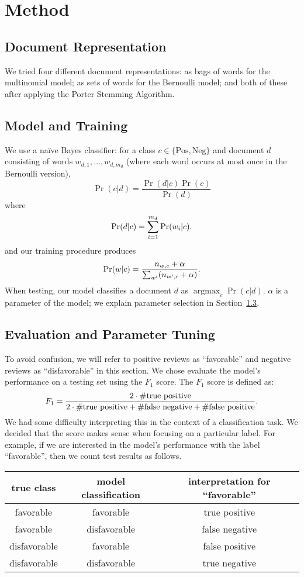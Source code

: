 \documentclass{article}
\DeclareMathOperator{\Argmax}{argmax}
\newcommand{\PosC}{\mathrm{Pos}}
\newcommand{\NegC}{\mathrm{Neg}}
\begin{document}
\section{Method}

\subsection{Document Representation}

We tried four different document representations: as bags of words for the multinomial model; as sets of words for the Bernoulli model; and both of these after applying the Porter Stemming Algorithm.

\subsection{Model and Training}

We use a na\"ive Bayes classifier: for a class \(c \in \{\PosC, \NegC\}\) and document \(d\) consisting of words \(w_{d,1},\dotsc,w_{d,m_d}\) (where each word occurs at most once in the Bernoulli version),
\[\Pr(c|d)=\frac{\Pr(d|c)\Pr(c)}{\Pr(d)}\]
where
\[\Pr(d|c)=\sum_{i=1}^{m_d}\Pr(w_i|c)\ldotp\]
and our training procedure produces
\[\Pr(w|c)=\frac{n_{w,c}+\alpha}{\sum_{w'}(n_{w',c}+\alpha)}\ldotp\]
When testing, our model classifies a document \(d\) as \(\Argmax_c\Pr(c|d)\).
\(\alpha\) is a parameter of the model; we explain parameter selection in Section~\ref{sec:EvalAndTuning}.

\subsection{Evaluation and Parameter Tuning}
\label{sec:EvalAndTuning}

To avoid confusion, we will refer to positive reviews as ``favorable'' and negative reviews as ``disfavorable'' in this section.  We chose evaluate the model's performance on a testing set using the \(F_1\) score.  The \(F_1\) score is defined as:
\[
  F_1=
  \frac
      {2\cdot\#\text{true positive}}
      {2\cdot\#\text{true positive}+\#\text{false negative}+\#\text{false positive}}
  \ldotp
\]
We had some difficulty interpreting this in the context of a classification task.
We decided that the score makes sense when focusing on a particular label.
For example, if we are interested in the model's performance with the label ``favorable'', then we count test results as follows.

\begin{tabular}{c|c|c}
  true class & model classification & interpretation for ``favorable'' \\
  \hline
  favorable & favorable & true positive \\
  favorable & disfavorable & false negative \\
  disfavorable & favorable & false positive \\
  disfavorable & disfavorable & true negative \\
\end{tabular}
\end{document}
